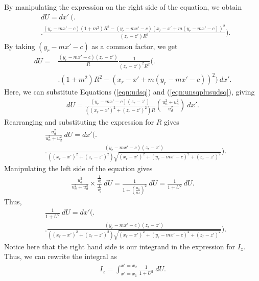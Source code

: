 By manipulating the expression on the right side of the equation, we obtain
\begin{align}
    &dU = dx'\ \Bigg( \Bigg. \nonumber \\
    & \Bigg. \frac{\left(y_r-mx'-c\right)\left(1+m^2\right)R^2-\left(y_r-mx'-c\right)\left(x_r-x'+m\left(y_r-mx'-c\right)\right)^2}{\left(z_r-z'\right)R^3} \Bigg) \text{.}
\end{align}
By taking \(\left(y_r-mx'-c\right)\) as a common factor, we get
\begin{align}
    dU = &\frac{\left(y_r-mx'-c\right)\left(z_r-z'\right)}{R} \frac{1}{\left(z_r-z'\right)^2R^2} \bigg( \bigg. \nonumber \\
    & \bigg. \left(1+m^2\right)R^2-\left(x_r-x'+m\left(y_r-mx'-c\right)\right)^2 \bigg)\ dx' \text{.}
\end{align}
Here, we can substitute Equations (\ref{eqn:udsq}) and (\ref{eqn:unsqplusudsq}), giving
\begin{align}
    dU = \frac{\left(y_r-mx'-c\right)\left(z_r-z'\right)}{\left(\left(x_r-x'\right)^2+\left(z_r-z'\right)^2\right)R} \left(\frac{u_n^2+u_d^2}{u_d^2}\right)\ dx' \text{.}
\end{align}
Rearranging and substituting the expression for \(R\) gives
\begin{align}
    &\frac{u_d^2}{u_n^2+u_d^2}\ dU = dx' \Bigg( \Bigg. \nonumber \\
    & \Bigg. \frac{\left(y_r-mx'-c\right)\left(z_r-z'\right)}{\left(\left(x_r-x'\right)^2+\left(z_r-z'\right)^2\right)\sqrt{\left(x_r-x'\right)^2+\left(y_r-mx'-c\right)^2+\left(z_r-z'\right)^2}} \Bigg) \text{.}
\end{align}
Manipulating the left side of the equation gives
\begin{align}
    \frac{u_d^2}{u_n^2+u_d^2} \times \frac{\frac{1}{u_d^2}}{\frac{1}{u_d^2}}\ dU = \frac{1}{1+\left(\frac{u_n}{u_d}\right)^2}\ dU = \frac{1}{1+U^2}\ dU \text{.}
\end{align}
Thus,
\begin{align}
    &\frac{1}{1+U^2}\ dU = dx' \Bigg( \Bigg. \nonumber \\
    &\Bigg. \frac{\left(y_r-mx'-c\right)\left(z_r-z'\right)}{\left(\left(x_r-x'\right)^2+\left(z_r-z'\right)^2\right)\sqrt{\left(x_r-x'\right)^2+\left(y_r-mx'-c\right)^2+\left(z_r-z'\right)^2}} \Bigg) \text{.}
\end{align}
Notice here that the right hand side is our integrand in the expression for \(I_z\). Thus, we can rewrite the integral as
\begin{align}
    I_z = \int_{x'=x_1}^{x'=x_2} \frac{1}{1+U^2}\ dU \text{.}
\end{align}
